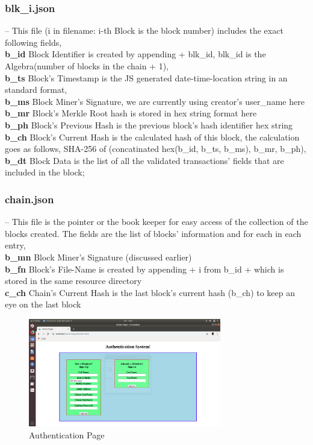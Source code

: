 \subsubsection{blk\_i.json}
-- This file (i in filename: i-th Block is the block number) includes the exact following fields,\\
\textbf{b\_id} Block Identifier is created by appending  + blk\_id, blk\_id is the Algebra(number of blocks in the chain + 1), \\
\textbf{b\_ts} Block's Timestamp is the JS generated date-time-location string in an standard format, \\
\textbf{b\_ms} Block Miner's Signature, we are currently using creator's user\_name here \\
\textbf{b\_mr} Block's Merkle Root hash is stored in hex string format here \\
\textbf{b\_ph} Block's Previous Hash is the previous block's hash identifier hex string \\
\textbf{b\_ch} Block's Current Hash is the calculated hash of this block, the calculation goes as follows, SHA-256 of (concatinated hex(b\_id, b\_ts, b\_ms), b\_mr, b\_ph), \\
\textbf{b\_dt} Block Data is the list of all the validated transactions' fields that are included in the block; \\

\subsubsection{chain.json} -- This file is the pointer or the book keeper for easy access of the collection of the blocks created. The fields are the list of blocks' information and for each in each entry, \\
\textbf{b\_mn} Block Miner's Signature (discussed earlier) \\
\textbf{b\_fn} Block's File-Name is created by appending  + i from b\_id +  which is stored in the same resource directory \\
\textbf{c\_ch} Chain's Current Hash is the last block's current hash (b\_ch) to keep an eye on the last block \\

\begin{figure}
\begin{center}
\includegraphics[width=0.75\textwidth]{./img_src/screen0.png}
\end{center}
\caption{Authentication Page}
\label{fig:authorize}
\end{figure}

